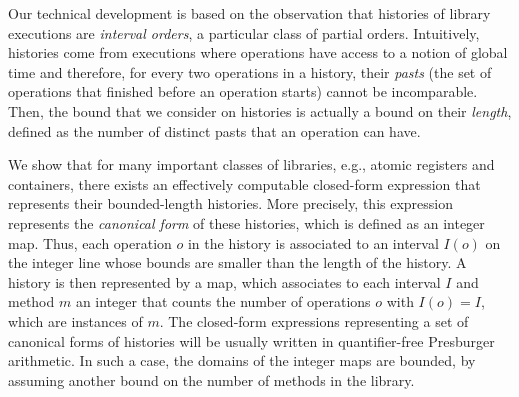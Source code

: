 Our technical development is based on the observation that histories of library
executions are \emph{interval orders}, a particular class of partial orders.
Intuitively, histories come from executions where operations have access to a
notion of global time and therefore, for every two operations in a history,
their \emph{pasts} (the set of operations that finished before an operation
starts) cannot be incomparable. Then, the bound that we consider on histories
is actually a bound on their \emph{length}, defined as the number of distinct
pasts that an operation can have.

We show that for many important classes of libraries, e.g., atomic registers and containers, there exists an effectively
computable closed-form expression that represents their bounded-length histories. More precisely, this
expression represents the \emph{canonical form} of these histories, which is defined as an integer map.
Thus, each operation $o$ in the history is associated to an interval $I(o)$ on the integer
line whose bounds are smaller than the length of the history. A history is then
represented by a map, which associates to each interval $I$ and method $m$ an
integer that counts the number of operations $o$ with $I(o)=I$, which are
instances of $m$. The closed-form expressions representing a set of canonical forms of histories 
will be usually written in quantifier-free Presburger arithmetic. In such a case, 
the domains of the integer maps are bounded, by assuming another bound 
on the number of methods in the library.

%

